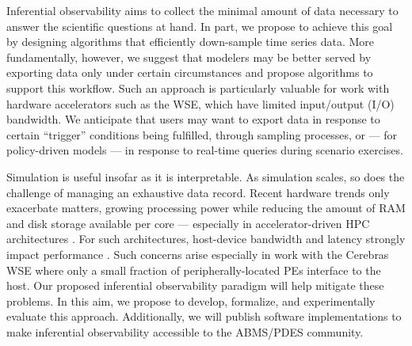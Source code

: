Inferential observability aims to collect the minimal amount of data necessary to answer the scientific questions at hand.
In part, we propose to achieve this goal by designing algorithms that efficiently down-sample time series data.
More fundamentally, however, we suggest that modelers may be better served by exporting data only under certain circumstances and propose algorithms to support this workflow.
Such an approach is particularly valuable for work with hardware accelerators such as the WSE, which have limited input/output (I/O) bandwidth.
We anticipate that users may want to export data in response to certain ``trigger'' conditions being fulfilled, through sampling processes, or --- for policy-driven models --- in response to real-time queries during scenario exercises.

Simulation is useful insofar as it is interpretable.
As simulation scales, so does the challenge of managing an exhaustive data record.
Recent hardware trends only exacerbate matters, growing processing power while reducing the amount of RAM and disk storage available per core --- especially in accelerator-driven HPC architectures \citep{khan2021analysis, gholami2024ai}.
For such architectures, host-device bandwidth and latency strongly impact performance \citep{kwon2018beyond}.
Such concerns arise especially in work with the Cerebras WSE where only a small fraction of peripherally-located PEs interface to the host.
Our proposed inferential observability paradigm will help mitigate these problems.
In this aim, we propose to develop, formalize, and experimentally evaluate this approach.
Additionally, we will publish software implementations to make inferential observability accessible to the ABMS/PDES community.
